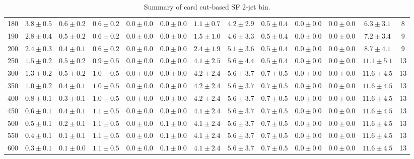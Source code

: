 \begin{table}
{\begin{center}
\begin{tabular}{l | c c | c c c c c c c c  | c c}
180 & $3.8\pm0.5$ & $0.6\pm0.2$ & $0.6\pm0.2$ & $0.0\pm0.0$ & $0.0\pm0.0$ & $1.1\pm0.7$ & $4.2\pm2.9$ & $0.5\pm0.4$ & $0.0\pm0.0$ & $0.0\pm0.0$ & $6.3\pm3.1$ & 8 \\
190 & $2.8\pm0.4$ & $0.5\pm0.2$ & $0.6\pm0.2$ & $0.0\pm0.0$ & $0.0\pm0.0$ & $1.5\pm1.0$ & $4.6\pm3.3$ & $0.5\pm0.4$ & $0.0\pm0.0$ & $0.0\pm0.0$ & $7.2\pm3.4$ & 9 \\
200 & $2.4\pm0.3$ & $0.4\pm0.1$ & $0.6\pm0.2$ & $0.0\pm0.0$ & $0.0\pm0.0$ & $2.4\pm1.9$ & $5.1\pm3.6$ & $0.5\pm0.4$ & $0.0\pm0.0$ & $0.0\pm0.0$ & $8.7\pm4.1$ & 9 \\
250 & $1.5\pm0.2$ & $0.5\pm0.2$ & $0.9\pm0.5$ & $0.0\pm0.0$ & $0.0\pm0.0$ & $4.1\pm2.5$ & $5.6\pm4.4$ & $0.5\pm0.4$ & $0.0\pm0.0$ & $0.0\pm0.0$ & $11.1\pm5.1$ & 13 \\
300 & $1.3\pm0.2$ & $0.5\pm0.2$ & $1.0\pm0.5$ & $0.0\pm0.0$ & $0.0\pm0.0$ & $4.2\pm2.4$ & $5.6\pm3.7$ & $0.7\pm0.5$ & $0.0\pm0.0$ & $0.0\pm0.0$ & $11.6\pm4.5$ & 13 \\
350 & $1.0\pm0.2$ & $0.4\pm0.1$ & $1.0\pm0.5$ & $0.0\pm0.0$ & $0.0\pm0.0$ & $4.2\pm2.4$ & $5.6\pm3.7$ & $0.7\pm0.5$ & $0.0\pm0.0$ & $0.0\pm0.0$ & $11.6\pm4.5$ & 13 \\
400 & $0.8\pm0.1$ & $0.3\pm0.1$ & $1.0\pm0.5$ & $0.0\pm0.0$ & $0.0\pm0.0$ & $4.2\pm2.4$ & $5.6\pm3.7$ & $0.7\pm0.5$ & $0.0\pm0.0$ & $0.0\pm0.0$ & $11.6\pm4.5$ & 13 \\
450 & $0.6\pm0.1$ & $0.4\pm0.1$ & $1.1\pm0.5$ & $0.0\pm0.0$ & $0.0\pm0.0$ & $4.1\pm2.4$ & $5.6\pm3.7$ & $0.7\pm0.5$ & $0.0\pm0.0$ & $0.0\pm0.0$ & $11.6\pm4.5$ & 13 \\
500 & $0.5\pm0.1$ & $0.2\pm0.1$ & $1.1\pm0.5$ & $0.0\pm0.0$ & $0.1\pm0.0$ & $4.1\pm2.4$ & $5.6\pm3.7$ & $0.7\pm0.5$ & $0.0\pm0.0$ & $0.0\pm0.0$ & $11.6\pm4.5$ & 13 \\
550 & $0.4\pm0.1$ & $0.1\pm0.1$ & $1.1\pm0.5$ & $0.0\pm0.0$ & $0.1\pm0.0$ & $4.1\pm2.4$ & $5.6\pm3.7$ & $0.7\pm0.5$ & $0.0\pm0.0$ & $0.0\pm0.0$ & $11.6\pm4.5$ & 13 \\
600 & $0.3\pm0.1$ & $0.1\pm0.0$ & $1.1\pm0.5$ & $0.0\pm0.0$ & $0.1\pm0.0$ & $4.1\pm2.4$ & $5.6\pm3.7$ & $0.7\pm0.5$ & $0.0\pm0.0$ & $0.0\pm0.0$ & $11.6\pm4.5$ & 13 \\
\hline
\end{tabular}
\end{center}
}
\caption{Summary of card cut-based SF 2-jet bin.}
\end{table}
